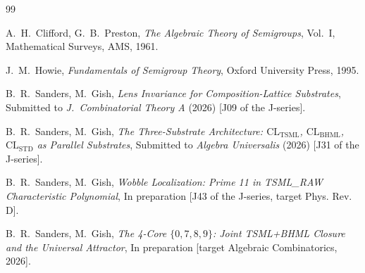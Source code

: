 \documentclass[11pt,reqno]{amsart}
\theoremstyle{plain}
\theoremstyle{definition}
\theoremstyle{remark}
\newcommand{\TSML}{\mathrm{TSML}}
\newcommand{\BHML}{\mathrm{BHML}}
\begin{document}
\begin{thebibliography}{99}

A.~H.~Clifford, G.~B.~Preston,
\emph{The Algebraic Theory of Semigroups}, Vol.\ I,
Mathematical Surveys, AMS, 1961.

J.~M.~Howie,
\emph{Fundamentals of Semigroup Theory}, Oxford University Press, 1995.

B.~R.~Sanders, M.~Gish,
\emph{Lens Invariance for Composition-Lattice Substrates},
Submitted to \emph{J.\ Combinatorial Theory A} (2026)
[J09 of the J-series].

B.~R.~Sanders, M.~Gish,
\emph{The Three-Substrate Architecture: $\mathrm{CL}_\TSML$, $\mathrm{CL}_\BHML$, $\mathrm{CL}_\mathrm{STD}$ as Parallel Substrates},
Submitted to \emph{Algebra Universalis} (2026)
[J31 of the J-series].

B.~R.~Sanders, M.~Gish,
\emph{Wobble Localization: Prime 11 in TSML\_RAW Characteristic Polynomial},
In preparation [J43 of the J-series, target Phys. Rev. D].

B.~R.~Sanders, M.~Gish,
\emph{The 4-Core $\{0,7,8,9\}$: Joint TSML+BHML Closure and the Universal Attractor},
In preparation [target Algebraic Combinatorics, 2026].

\end{thebibliography}
\end{document}

